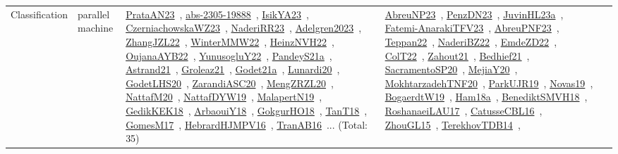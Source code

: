 {\begin{longtable}{lp{3cm}>{\raggedright\arraybackslash}p{6cm}>{\raggedright\arraybackslash}p{6cm}>{\raggedright\arraybackslash}p{8cm}}
Classification & parallel machine & \href{works/PrataAN23.pdf}{PrataAN23}~\cite{PrataAN23}, \href{works/abs-2305-19888.pdf}{abs-2305-19888}~\cite{abs-2305-19888}, \href{works/IsikYA23.pdf}{IsikYA23}~\cite{IsikYA23}, \href{works/CzerniachowskaWZ23.pdf}{CzerniachowskaWZ23}~\cite{CzerniachowskaWZ23}, \href{works/NaderiRR23.pdf}{NaderiRR23}~\cite{NaderiRR23}, \href{works/Adelgren2023.pdf}{Adelgren2023}~\cite{Adelgren2023}, \href{works/ZhangJZL22.pdf}{ZhangJZL22}~\cite{ZhangJZL22}, \href{works/WinterMMW22.pdf}{WinterMMW22}~\cite{WinterMMW22}, \href{works/HeinzNVH22.pdf}{HeinzNVH22}~\cite{HeinzNVH22}, \href{works/OujanaAYB22.pdf}{OujanaAYB22}~\cite{OujanaAYB22}, \href{works/YunusogluY22.pdf}{YunusogluY22}~\cite{YunusogluY22}, \href{works/PandeyS21a.pdf}{PandeyS21a}~\cite{PandeyS21a}, \href{works/Astrand21.pdf}{Astrand21}~\cite{Astrand21}, \href{works/Groleaz21.pdf}{Groleaz21}~\cite{Groleaz21}, \href{works/Godet21a.pdf}{Godet21a}~\cite{Godet21a}, \href{works/Lunardi20.pdf}{Lunardi20}~\cite{Lunardi20}, \href{works/GodetLHS20.pdf}{GodetLHS20}~\cite{GodetLHS20}, \href{works/ZarandiASC20.pdf}{ZarandiASC20}~\cite{ZarandiASC20}, \href{works/MengZRZL20.pdf}{MengZRZL20}~\cite{MengZRZL20}, \href{works/NattafM20.pdf}{NattafM20}~\cite{NattafM20}, \href{works/NattafDYW19.pdf}{NattafDYW19}~\cite{NattafDYW19}, \href{works/MalapertN19.pdf}{MalapertN19}~\cite{MalapertN19}, \href{works/GedikKEK18.pdf}{GedikKEK18}~\cite{GedikKEK18}, \href{works/ArbaouiY18.pdf}{ArbaouiY18}~\cite{ArbaouiY18}, \href{works/GokgurHO18.pdf}{GokgurHO18}~\cite{GokgurHO18}, \href{works/TanT18.pdf}{TanT18}~\cite{TanT18}, \href{works/GomesM17.pdf}{GomesM17}~\cite{GomesM17}, \href{works/HebrardHJMPV16.pdf}{HebrardHJMPV16}~\cite{HebrardHJMPV16}, \href{works/TranAB16.pdf}{TranAB16}~\cite{TranAB16}... (Total: 35) & \href{works/AbreuNP23.pdf}{AbreuNP23}~\cite{AbreuNP23}, \href{works/PenzDN23.pdf}{PenzDN23}~\cite{PenzDN23}, \href{works/JuvinHL23a.pdf}{JuvinHL23a}~\cite{JuvinHL23a}, \href{works/Fatemi-AnarakiTFV23.pdf}{Fatemi-AnarakiTFV23}~\cite{Fatemi-AnarakiTFV23}, \href{works/AbreuPNF23.pdf}{AbreuPNF23}~\cite{AbreuPNF23}, \href{works/Teppan22.pdf}{Teppan22}~\cite{Teppan22}, \href{works/NaderiBZ22.pdf}{NaderiBZ22}~\cite{NaderiBZ22}, \href{works/EmdeZD22.pdf}{EmdeZD22}~\cite{EmdeZD22}, \href{works/ColT22.pdf}{ColT22}~\cite{ColT22}, \href{works/Zahout21.pdf}{Zahout21}~\cite{Zahout21}, \href{works/Bedhief21.pdf}{Bedhief21}~\cite{Bedhief21}, \href{works/SacramentoSP20.pdf}{SacramentoSP20}~\cite{SacramentoSP20}, \href{works/MejiaY20.pdf}{MejiaY20}~\cite{MejiaY20}, \href{works/MokhtarzadehTNF20.pdf}{MokhtarzadehTNF20}~\cite{MokhtarzadehTNF20}, \href{works/ParkUJR19.pdf}{ParkUJR19}~\cite{ParkUJR19}, \href{works/Novas19.pdf}{Novas19}~\cite{Novas19}, \href{works/BogaerdtW19.pdf}{BogaerdtW19}~\cite{BogaerdtW19}, \href{works/Ham18a.pdf}{Ham18a}~\cite{Ham18a}, \href{works/BenediktSMVH18.pdf}{BenediktSMVH18}~\cite{BenediktSMVH18}, \href{works/RoshanaeiLAU17.pdf}{RoshanaeiLAU17}~\cite{RoshanaeiLAU17}, \href{works/CatusseCBL16.pdf}{CatusseCBL16}~\cite{CatusseCBL16}, \href{works/ZhouGL15.pdf}{ZhouGL15}~\cite{ZhouGL15}, \href{works/TerekhovTDB14.pdf}{TerekhovTDB14}~\cite{TerekhovTDB14}, 
\end{longtable}}
